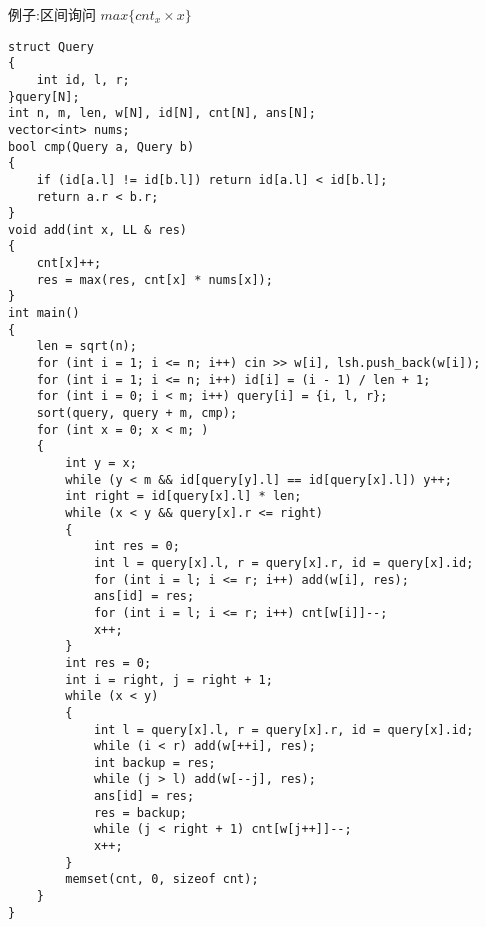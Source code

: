 \documentclass[a4paper,fontset=none]{ctexart}
\begin{document}
例子:区间询问 $max\{cnt_x\times x\}$
\begin{verbatim}
struct Query
{
    int id, l, r;
}query[N];
int n, m, len, w[N], id[N], cnt[N], ans[N];
vector<int> nums;
bool cmp(Query a, Query b)
{
    if (id[a.l] != id[b.l]) return id[a.l] < id[b.l];
    return a.r < b.r;
}
void add(int x, LL & res)
{
    cnt[x]++;
    res = max(res, cnt[x] * nums[x]);
}
int main()
{
    len = sqrt(n);
    for (int i = 1; i <= n; i++) cin >> w[i], lsh.push_back(w[i]);
    for (int i = 1; i <= n; i++) id[i] = (i - 1) / len + 1;
    for (int i = 0; i < m; i++) query[i] = {i, l, r};
    sort(query, query + m, cmp);
    for (int x = 0; x < m; )
    {
        int y = x;
        while (y < m && id[query[y].l] == id[query[x].l]) y++;
        int right = id[query[x].l] * len;
        while (x < y && query[x].r <= right)
        {
            int res = 0;
            int l = query[x].l, r = query[x].r, id = query[x].id;
            for (int i = l; i <= r; i++) add(w[i], res);
            ans[id] = res;
            for (int i = l; i <= r; i++) cnt[w[i]]--;
            x++;
        }
        int res = 0;
        int i = right, j = right + 1;
        while (x < y)
        {
            int l = query[x].l, r = query[x].r, id = query[x].id;
            while (i < r) add(w[++i], res);
            int backup = res;
            while (j > l) add(w[--j], res);
            ans[id] = res;
            res = backup;
            while (j < right + 1) cnt[w[j++]]--;
            x++;
        }
        memset(cnt, 0, sizeof cnt);
    }
}
\end{verbatim}
\end{document}

